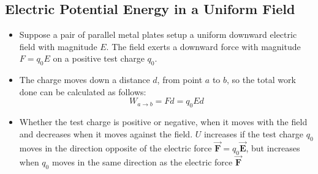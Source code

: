 \documentclass[11pt, a4paper]{article}
\begin{document}
\subsection{Electric Potential Energy in a Uniform Field}
\begin{itemize}
    \item Suppose a pair of parallel metal plates setup a uniform downward electric field
        with magnitude $E$. The field exerts a downward force with magnitude $F = q_0E$
        on a positive test charge $q_0$.
    \item The charge moves down a distance $d$, from point $a$ to $b$, so the total work
        done can be calculated as follows:
        \begin{equation}
            W_{a\rightarrow b} = Fd = q_0 Ed
        \end{equation}
    \item Whether the test charge is positive or negative, when it moves with the field
        and decreases when it moves against the field. $U$ increases if the test charge
        $q_0$ moves in the direction opposite of the electric force
        $\vec{\mathbf{F}}=q_0 \vec{\mathbf{E}}$, but increases when $q_0$ moves in the
        same direction as the electric force $\vec{\mathbf{F}}$
\end{itemize}
\end{document}
